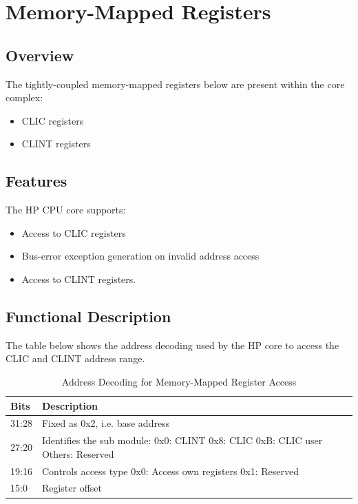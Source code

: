 \documentclass[main\_\_EN.tex]{subfiles}
\begin{document}
\newpage
\section{Memory-Mapped Registers}
\label{sec:riscvcpu-tcip}

\subsection{Overview}
\label{sec:riscvcpu-tcip-overview}


The tightly-coupled memory-mapped registers below are present within the core complex:

\begin{itemize}
    \item CLIC registers
    \item CLINT registers
\end{itemize}

\subsection{Features}
\label{sec:riscvcpu-tcip-features}

The HP CPU core supports:
\begin{itemize}
    \item Access to CLIC registers
    \item Bus-error exception generation on invalid address access
    \item Access to CLINT registers.
\end{itemize}

\subsection{Functional Description}
\label{sec:riscvcpu-tcip-func-descr}

The table below shows the address decoding used by the HP core to access the CLIC and CLINT address range.

\begin{longtable}{ | l | p{5 cm} | }
\caption{Address Decoding for Memory-Mapped Register Access} \label{tab:riscvcpu-tcip-table}
\\ \hline
\rowcolor{lightgray}
Bits & Description \\ \hline
31:28 & Fixed as 0x2, i.e. base address \\ \hline
27:20 & Identifies the sub module: \newline 0x0: CLINT \newline 0x8: CLIC \newline 0xB: CLIC user \newline Others: Reserved \\ \hline
19:16 & Controls access type \newline 0x0: Access own registers \newline 0x1: Reserved\\ \hline
15:0 & Register offset \\ \hline
\end{longtable}
\end{document}
